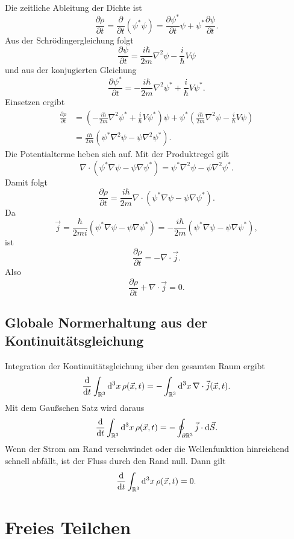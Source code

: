 \begin{derivationbox}
Die zeitliche Ableitung der Dichte ist
\[
    \frac{\partial \rho}{\partial t}
    =\frac{\partial}{\partial t}(\psi^*\psi)
    =\frac{\partial\psi^*}{\partial t}\psi+\psi^*\frac{\partial\psi}{\partial t}.
\]
Aus der Schrödingergleichung folgt
\[
    \frac{\partial\psi}{\partial t}
    =\frac{i\hbar}{2m}\nabla^2\psi-\frac{i}{\hbar}V\psi
\]
und aus der konjugierten Gleichung
\[
    \frac{\partial\psi^*}{\partial t}
    =-\frac{i\hbar}{2m}\nabla^2\psi^*+\frac{i}{\hbar}V\psi^*.
\]
Einsetzen ergibt
\[
\begin{aligned}
    \frac{\partial \rho}{\partial t}
    &=\left(-\frac{i\hbar}{2m}\nabla^2\psi^*+\frac{i}{\hbar}V\psi^*\right)\psi
      +\psi^*\left(\frac{i\hbar}{2m}\nabla^2\psi-\frac{i}{\hbar}V\psi\right)\\
    &=\frac{i\hbar}{2m}\left(\psi^*\nabla^2\psi-\psi\nabla^2\psi^*\right).
\end{aligned}
\]
Die Potentialterme heben sich auf. Mit der Produktregel gilt
\[
    \nabla\cdot(\psi^*\nabla\psi-\psi\nabla\psi^*)
    =\psi^*\nabla^2\psi-\psi\nabla^2\psi^*.
\]
Damit folgt
\[
    \frac{\partial \rho}{\partial t}
    =\frac{i\hbar}{2m}\nabla\cdot(\psi^*\nabla\psi-\psi\nabla\psi^*).
\]
Da
\[
    \vec{j}=\frac{\hbar}{2mi}(\psi^*\nabla\psi-\psi\nabla\psi^*)
    =-\frac{i\hbar}{2m}(\psi^*\nabla\psi-\psi\nabla\psi^*),
\]
ist
\[
    \frac{\partial \rho}{\partial t}=-\nabla\cdot\vec{j}.
\]
Also
\[
    \frac{\partial \rho}{\partial t}+\nabla\cdot\vec{j}=0.
\]
\end{derivationbox}

\subsection{Globale Normerhaltung aus der Kontinuitätsgleichung}

Integration der Kontinuitätsgleichung über den gesamten Raum ergibt
\[
    \frac{\mathrm{d}}{\mathrm{d} t}\int_{\mathbb{R}^3}\mathrm{d}^3x\,\rho(\vec{x},t)
    =-\int_{\mathbb{R}^3}\mathrm{d}^3x\,\nabla\cdot\vec{j}(\vec{x},t).
\]
Mit dem Gaußschen Satz wird daraus
\[
    \frac{\mathrm{d}}{\mathrm{d} t}\int_{\mathbb{R}^3}\mathrm{d}^3x\,\rho(\vec{x},t)
    =-\oint_{\partial\mathbb{R}^3}\vec{j}\cdot\mathrm{d}\vec{S}.
\]
Wenn der Strom am Rand verschwindet oder die Wellenfunktion hinreichend schnell abfällt, ist der Fluss durch den Rand null. Dann gilt
\[
    \frac{\mathrm{d}}{\mathrm{d} t}\int_{\mathbb{R}^3}\mathrm{d}^3x\,\rho(\vec{x},t)=0.
\]

\section{Freies Teilchen}

